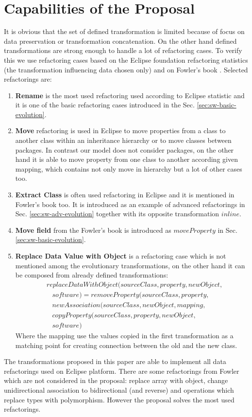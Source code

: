 \documentclass[runningheads]{comsis}
\begin{document}
\section{Capabilities of the Proposal}
\label{sec:case}
It is obvious that the set of defined transformation is limited because of focus on data preservation or transformation concatenation. On the other hand defined transformations are strong enough to handle a lot of refactoring cases. To verify this we use refactoring cases based on the Eclipse foundation refactoring statistics \cite{Eclipse:Refactoring} (the transformation influencing data chosen only) and on Fowler's book \cite{Fowler:Refactoring}. Selected refactorings are:
\begin{enumerate}
	\item \textbf{Rename} is the most used refactoring used according to Eclipse statistic and it is one of the basic refactoring cases introduced in the Sec. \ref{sec:sw-basic-evolution}.
	\item  \textbf{Move} refactoring is used in Eclipse to move properties from a class to another class within an inheritance hierarchy or to move classes between packages. In contrast our model does not consider packages, on the other hand it is able to move property from one class to another according given mapping, which contains not only move in hierarchy but a lot of other cases too.
	\item \textbf{Extract Class} is often used refactoring in Eclipse and it is mentioned in Fowler's book too. It is introduced as an example of advanced refactorings in Sec. \ref{sec:sw-adv-evolution} together with its opposite transformation $inline$.
	\item \textbf{Move field} from the Fowler's book is introduced as $moveProperty$ in Sec. \ref{sec:sw-basic-evolution}.
	\item \textbf{Replace Data Value with Object} is a refactoring case which is not mentioned among the evolutionary transformations, on the other hand it can be composed from already defined transformations:
	\begin{align}
& replaceDataWithObject(sourceClass, property, newObject, \nonumber \\
& \; \; \; software) = removeProperty(sourceClass, property, \nonumber \\
& \; \; \; newAssociation(sourceClass, newObject,  mapping,\nonumber  \\
& \; \; \; copyProperty(sourceClass, property, newObject, \nonumber \\ & \; \; \;  software)
	\end{align}
Where the mapping use the values copied in the first transformation as a matching point for creating connection between the old and the new class.
\end{enumerate}
The transformations proposed in this paper are able to implement all data refactorings used on Eclipse platform. There are some refactorings from Fowler which are not considered in the proposal: replace array with object, change unidirectional association to bidirectional (and reverse) and operations which replace types with polymorphism. However the proposal solves the most used refactorings.
\end{document}
